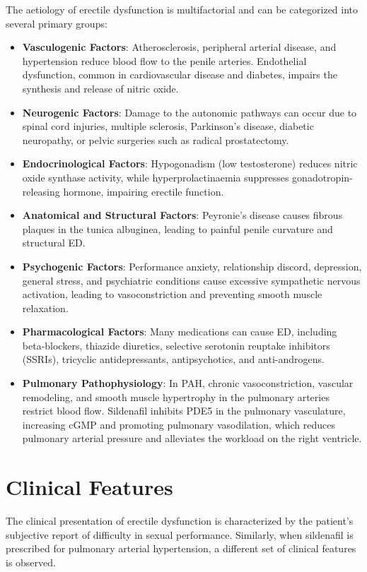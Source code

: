 The aetiology of erectile dysfunction is multifactorial and can be categorized into several primary groups:
\begin{itemize}
    \item \textbf{Vasculogenic Factors}: Atherosclerosis, peripheral arterial disease, and hypertension reduce blood flow to the penile arteries. Endothelial dysfunction, common in cardiovascular disease and diabetes, impairs the synthesis and release of nitric oxide.
    \item \textbf{Neurogenic Factors}: Damage to the autonomic pathways can occur due to spinal cord injuries, multiple sclerosis, Parkinson's disease, diabetic neuropathy, or pelvic surgeries such as radical prostatectomy.
    \item \textbf{Endocrinological Factors}: Hypogonadism (low testosterone) reduces nitric oxide synthase activity, while hyperprolactinaemia suppresses gonadotropin-releasing hormone, impairing erectile function.
    \item \textbf{Anatomical and Structural Factors}: Peyronie's disease causes fibrous plaques in the tunica albuginea, leading to painful penile curvature and structural ED.
    \item \textbf{Psychogenic Factors}: Performance anxiety, relationship discord, depression, general stress, and psychiatric conditions cause excessive sympathetic nervous activation, leading to vasoconstriction and preventing smooth muscle relaxation.
    \item \textbf{Pharmacological Factors}: Many medications can cause ED, including beta-blockers, thiazide diuretics, selective serotonin reuptake inhibitors (SSRIs), tricyclic antidepressants, antipsychotics, and anti-androgens.
    \item \textbf{Pulmonary Pathophysiology}: In PAH, chronic vasoconstriction, vascular remodeling, and smooth muscle hypertrophy in the pulmonary arteries restrict blood flow. Sildenafil inhibits PDE5 in the pulmonary vasculature, increasing cGMP and promoting pulmonary vasodilation, which reduces pulmonary arterial pressure and alleviates the workload on the right ventricle.
\end{itemize}

\section*{Clinical Features}
The clinical presentation of erectile dysfunction is characterized by the patient's subjective report of difficulty in sexual performance. Similarly, when sildenafil is prescribed for pulmonary arterial hypertension, a different set of clinical features is observed.


